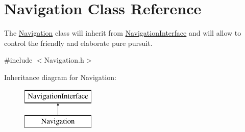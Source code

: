 \hypertarget{classNavigation}{}\section{Navigation Class Reference}
\label{classNavigation}


The \hyperlink{classNavigation}{Navigation} class will inherit from \hyperlink{classNavigationInterface}{Navigation\+Interface} and will allow to control the friendly and elaborate pure pursuit.  




{\ttfamily \#include $<$Navigation.\+h$>$}

Inheritance diagram for Navigation\+:\begin{figure}[H]
\begin{center}
\leavevmode
\includegraphics[height=2.000000cm]{classNavigation}
\end{center}
\end{figure}
